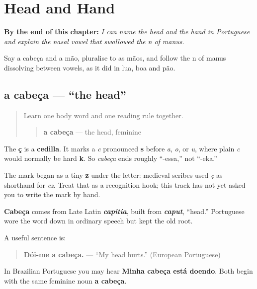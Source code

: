 
\chapter{Head and Hand}
\label{ch:pt-head-and-hand}

\begin{chapteropening}
\textbf{By the end of this chapter:} \emph{I can name the head and the hand in Portuguese and explain the nasal vowel that swallowed the n of manus.}

Say a cabeça and a mão, pluralise to as mãos, and follow the n of manus dissolving between vowels, as it did in lua, boa and pão.
\end{chapteropening}

\section[a cabeça]{a cabeça — “the head”}

\label{lesson:PT-C17-cabeca}



\begin{quote}
Learn one body word and one reading rule together.

\begin{quote}
\textbf{a cabeça} — the head, feminine
\end{quote}
\end{quote}

\begin{sounds}
The \textbf{ç} is a \textbf{cedilla}. It marks a \emph{c} pronounced \textbf{s} before \emph{a}, \emph{o}, or \emph{u}, where plain \emph{c} would normally be hard \textbf{k}. So \emph{cabeça} ends roughly “-essa,” not “-eka.”

The mark began as a tiny \textbf{z} under the letter: medieval scribes used \emph{ç} as shorthand for \emph{cz}. Treat that as a recognition hook; this track has not yet asked you to write the mark by hand.
\end{sounds}

\begin{cousinweb}
\textbf{Cabeça} comes from Late Latin \emph{\textbf{capitia}}, built from \emph{\textbf{caput}}, “head.” Portuguese wore the word down in ordinary speech but kept the old root.

A useful sentence is:

\begin{quote}
\textbf{Dói-me a cabeça.} — “My head hurts.” (European Portuguese)
\end{quote}

In Brazilian Portuguese you may hear \textbf{Minha cabeça está doendo}. Both begin with the same feminine noun \textbf{a cabeça}.
\end{cousinweb}

